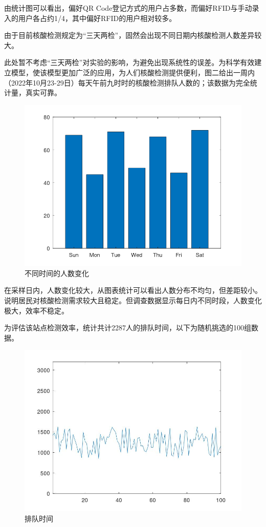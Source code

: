 \documentclass[
  journal=,
  manuscript=,
  year=2022,
  volume=01,
]{cup-journal}
\begin{document}
\par 由统计图可以看出，偏好QR Code登记方式的用户占多数，而偏好RFID与手动录入的用户各占约1/4，其中偏好RFID的用户相对较多。
\par 由于目前核酸检测规定为“三天两检”，固然会出现不同日期内核酸检测人数差异较大。
\par 此处暂不考虑“三天两检”对实验的影响，为避免出现系统性的误差。为科学有效建立模型，使该模型更加广泛的应用，为人们核酸检测提供便利，图二给出一周内（2022年10月23-29日）每天午前九时时的核酸检测排队人数的；该数据为完全统计量，真实可靠。

\begin{figure}[hbt!]
	\centering
	\includegraphics[width=0.75\linewidth]{fig/n.png}
	\caption{不同时间的人数变化}
	\label{fig_num}
\end{figure}

\par 在采样日内，人数变化较大，从图表统计可以看出人数分布不均匀，但差距较小。说明居民对核酸检测需求较大且稳定。但调查数据显示每日内不同时段，人数变化极大，效率不稳定。

\par 为评估该站点检测效率，统计共计2287人的排队时间，以下为随机挑选的100组数据。

\begin{figure}[hbt!]
	\centering
	\includegraphics[width=0.75\linewidth]{fig/t.jpg}
	\caption{排队时间}
	\label{fig_time}
\end{figure}
\end{document}
